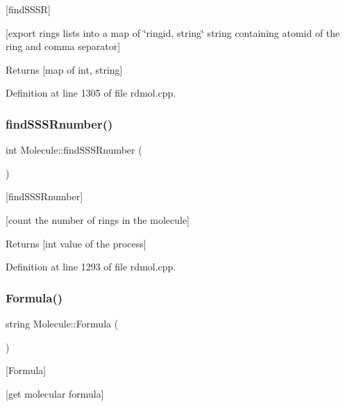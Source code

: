 \mbox{[}find\+S\+S\+SR\mbox{]} 

\mbox{[}export rings lists into a map of \char`\"{}ringid, string\char`\"{} string containing atomid of the ring and comma separator\mbox{]}

\begin{DoxyReturn}{Returns}
\mbox{[}map of int, string\mbox{]} 
\end{DoxyReturn}


Definition at line 1305 of file rdmol.\+cpp.

\mbox{\label{class_molecule_aaca41709fb5306fbfd11f4a75664e2ed}} 
\subsubsection{\texorpdfstring{find\+S\+S\+S\+Rnumber()}{findSSSRnumber()}}
{\footnotesize\ttfamily int Molecule\+::find\+S\+S\+S\+Rnumber (\begin{DoxyParamCaption}{ }\end{DoxyParamCaption})}



\mbox{[}find\+S\+S\+S\+Rnumber\mbox{]} 

\mbox{[}count the number of rings in the molecule\mbox{]}

\begin{DoxyReturn}{Returns}
\mbox{[}int value of the process\mbox{]} 
\end{DoxyReturn}


Definition at line 1293 of file rdmol.\+cpp.

\mbox{\label{class_molecule_a2a8be2c496fe515635ad70949ca3c634}} 
\subsubsection{\texorpdfstring{Formula()}{Formula()}}
{\footnotesize\ttfamily string Molecule\+::\+Formula (\begin{DoxyParamCaption}{ }\end{DoxyParamCaption})}



\mbox{[}Formula\mbox{]} 

\mbox{[}get molecular formula\mbox{]}

